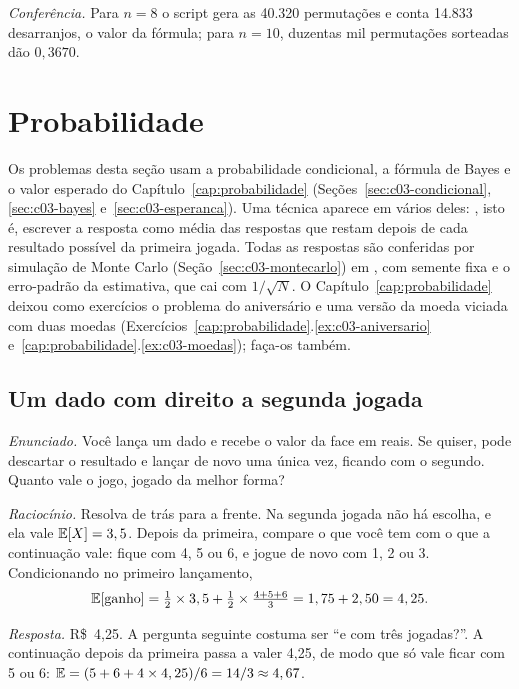 \emph{Conferência.} Para $n = 8$ o script gera as 40.320 permutações e conta 14.833 desarranjos, o valor da fórmula; para $n = 10$, duzentas mil permutações sorteadas dão $0,3670$.

\section{Probabilidade}
\label{sec:c16-probabilidade}

Os problemas desta seção usam a probabilidade condicional, a fórmula de Bayes e o valor esperado do Capítulo~\ref{cap:probabilidade} (Seções~\ref{sec:c03-condicional}, \ref{sec:c03-bayes} e~\ref{sec:c03-esperanca}). Uma técnica aparece em vários deles: , isto é, escrever a resposta como média das respostas que restam depois de cada resultado possível da primeira jogada. Todas as respostas são conferidas por simulação de Monte Carlo (Seção~\ref{sec:c03-montecarlo}) em , com semente fixa e o erro-padrão da estimativa, que cai com $1/\sqrt{N}$. O Capítulo~\ref{cap:probabilidade} deixou como exercícios o problema do aniversário e uma versão da moeda viciada com duas moedas (Exercícios~\ref{cap:probabilidade}.\ref{ex:c03-aniversario} e~\ref{cap:probabilidade}.\ref{ex:c03-moedas}); faça-os também.

\subsection{Um dado com direito a segunda jogada}

\emph{Enunciado.} Você lança um dado e recebe o valor da face em reais. Se quiser, pode descartar o resultado e lançar de novo uma única vez, ficando com o segundo. Quanto vale o jogo, jogado da melhor forma?

\emph{Raciocínio.} Resolva de trás para a frente. Na segunda jogada não há escolha, e ela vale $\operatorname{\mathbb{E}}[X] = 3,5$. Depois da primeira, compare o que você tem com o que a continuação vale: fique com 4, 5 ou 6, e jogue de novo com 1, 2 ou 3. Condicionando no primeiro lançamento,
\begin{equation*}
  \operatorname{\mathbb{E}}[\text{ganho}] = \tfrac{1}{2} \times 3,5 + \tfrac{1}{2} \times \tfrac{4 + 5 + 6}{3} = 1,75 + 2,50 = 4,25 .
\end{equation*}

\emph{Resposta.} R\$~4,25. A pergunta seguinte costuma ser ``e com três jogadas?''. A continuação depois da primeira passa a valer 4,25, de modo que só vale ficar com 5 ou 6: $\operatorname{\mathbb{E}} = (5 + 6 + 4 \times 4,25)/6 = 14/3 \approx 4,67$.

